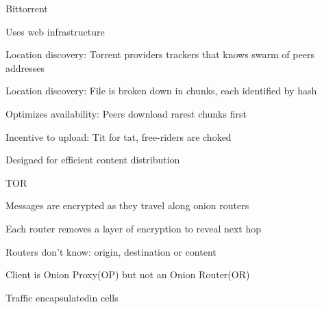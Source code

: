 \documentclass[main.tex]{subfiles}
\begin{document}
\full{ }
\begin{card}{Bittorrent}
\item Uses web infrastructure
\item Location discovery: Torrent providers trackers that knows swarm of peers addresses
\item Location discovery: File is broken down in chunks, each identified by hash
\item Optimizes availability: Peers download rarest chunks first
\item Incentive to upload: Tit for tat, free-riders are choked
\item Designed for efficient content distribution
\end{card}


\full{ }
\begin{card}{TOR}
\item Messages are encrypted as they travel along onion routers
\item Each router removes a layer of encryption to reveal next hop
\item Routers don't know: origin, destination or content
\item Client is Onion Proxy(OP) but not an Onion Router(OR)
\item Traffic encapsulatedin cells
\end{card}
\end{document}
